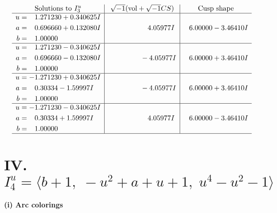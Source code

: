 \documentclass[1p]{elsarticle_modified}
\theoremstyle{definition}
\newcommand{\I}{\sqrt{-1}}
\begin{document}
$$\begin{array}{c|c|c}  
\text{Solutions to }I^u_{3}& \I (\text{vol} + \sqrt{-1}CS) & \text{Cusp shape}\\
 \hline 
\begin{aligned}
u &= \phantom{-}1.271230 + 0.340625 I \\
a &= \phantom{-}0.696660 + 0.132080 I \\
b &= \phantom{-}1.00000\phantom{ +0.000000I}\end{aligned}
 & \phantom{-0.000000 -}4.05977 I & \phantom{-}6.00000 - 3.46410 I \\ \hline\begin{aligned}
u &= \phantom{-}1.271230 - 0.340625 I \\
a &= \phantom{-}0.696660 - 0.132080 I \\
b &= \phantom{-}1.00000\phantom{ +0.000000I}\end{aligned}
 & \phantom{-0.000000 } -4.05977 I & \phantom{-}6.00000 + 3.46410 I \\ \hline\begin{aligned}
u &= -1.271230 + 0.340625 I \\
a &= \phantom{-}0.30334 - 1.59997 I \\
b &= \phantom{-}1.00000\phantom{ +0.000000I}\end{aligned}
 & \phantom{-0.000000 } -4.05977 I & \phantom{-}6.00000 + 3.46410 I \\ \hline\begin{aligned}
u &= -1.271230 - 0.340625 I \\
a &= \phantom{-}0.30334 + 1.59997 I \\
b &= \phantom{-}1.00000\phantom{ +0.000000I}\end{aligned}
 & \phantom{-0.000000 -}4.05977 I & \phantom{-}6.00000 - 3.46410 I\\
 \hline 
 \end{array}$$\newpage\newpage\renewcommand{\arraystretch}{1}
\centering \section*{IV. $I^u_{4}= \langle b+1,\;- u^2+a+u+1,\;u^4- u^2-1 \rangle$}
\flushleft \textbf{(i) Arc colorings}\\
\end{document}
